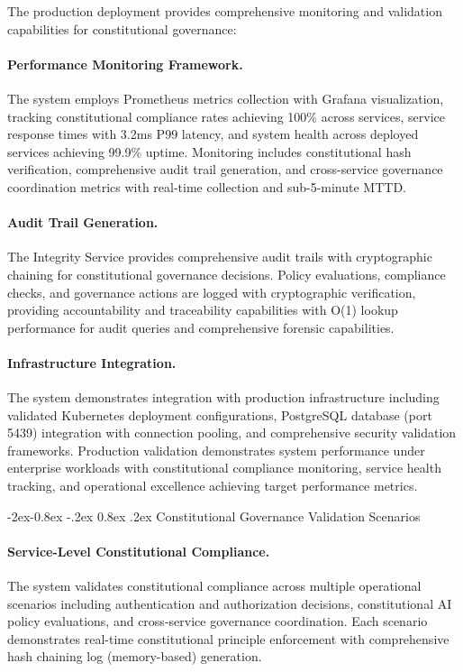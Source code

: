 \documentclass[manuscript,screen,9pt]{acmart}
\makeatletter
\renewcommand\subsubsection{\@startsection{subsubsection}{3}{\z@}%
  {-2ex\@plus -0.8ex \@minus -.2ex}%
  {0.8ex \@plus .2ex}%
  {\normalfont\normalsize\bfseries}}
\makeatother
\begin{document}
The production deployment provides comprehensive monitoring and validation capabilities for constitutional governance:

\paragraph{Performance Monitoring Framework.} The system employs Prometheus metrics collection with Grafana visualization, tracking constitutional compliance rates achieving 100\% across services, service response times with 3.2ms P99 latency, and system health across deployed services achieving 99.9\% uptime. Monitoring includes constitutional hash verification, comprehensive audit trail generation, and cross-service governance coordination metrics with real-time collection and sub-5-minute MTTD.

\paragraph{Audit Trail Generation.} The Integrity Service provides comprehensive audit trails with cryptographic chaining for constitutional governance decisions. Policy evaluations, compliance checks, and governance actions are logged with cryptographic verification, providing accountability and traceability capabilities with O(1) lookup performance for audit queries and comprehensive forensic capabilities.

\paragraph{Infrastructure Integration.} The system demonstrates integration with production infrastructure including validated Kubernetes deployment configurations, PostgreSQL database (port 5439) integration with connection pooling, and comprehensive security validation frameworks. Production validation demonstrates system performance under enterprise workloads with constitutional compliance monitoring, service health tracking, and operational excellence achieving target performance metrics.

\subsubsection{Constitutional Governance Validation Scenarios}
\label{subsubsec:governance_scenarios}

\paragraph{Service-Level Constitutional Compliance.} The system validates constitutional compliance across multiple operational scenarios including authentication and authorization decisions, constitutional AI policy evaluations, and cross-service governance coordination. Each scenario demonstrates real-time constitutional principle enforcement with comprehensive hash chaining log (memory-based) generation.
\end{document}
